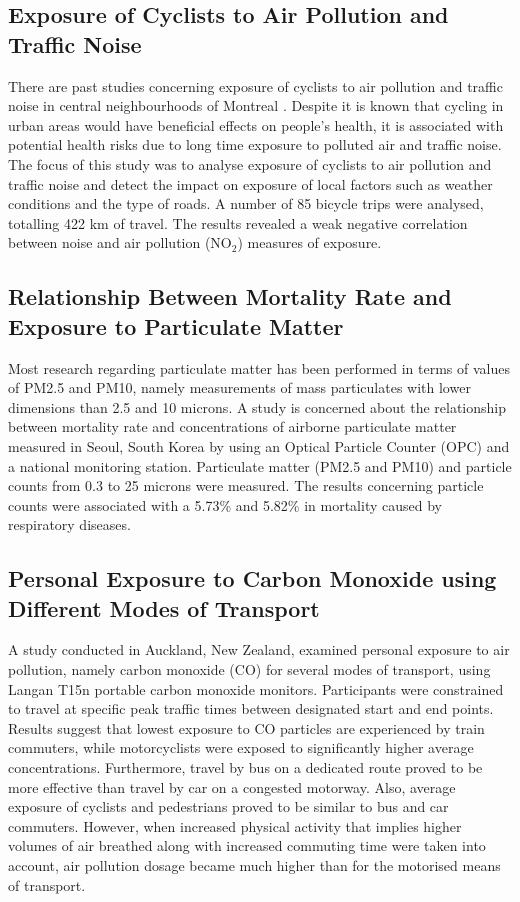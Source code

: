 \documentclass[bsc,frontabs,twoside,singlespacing, parskip,deptreport]{infthesis}     %
\begin{document}
\subsection{Exposure of Cyclists to Air Pollution and Traffic Noise}

There are past studies concerning exposure of cyclists to air pollution and traffic noise in central neighbourhoods of Montreal \cite{Apparicio201663}. Despite it is known that cycling in urban areas would have beneficial effects on people's health, it is associated with potential health risks due to long time exposure to polluted air and traffic noise. The focus of this study was to analyse exposure of cyclists to air pollution and traffic noise and detect the impact on exposure of local factors such as weather conditions and the type of roads. A number of 85 bicycle trips were analysed, totalling 422 km of travel. The results revealed a weak negative correlation between noise and air pollution (NO$_2$) measures of exposure.

\subsection{Relationship Between Mortality Rate and Exposure to Particulate Matter }

Most research regarding particulate matter has been performed in terms of values of PM2.5 and PM10, namely measurements of mass particulates with lower dimensions than 2.5 and 10 microns. A study \cite{Cho2008} is concerned about the relationship between mortality rate and concentrations of airborne particulate matter measured in Seoul, South Korea by using an Optical Particle Counter (OPC) and a national monitoring station. Particulate matter (PM2.5 and PM10) and particle counts from 0.3 to 25 microns were measured. The results concerning particle counts were associated with a 5.73\% and 5.82\% in mortality caused by respiratory diseases.


\subsection{Personal Exposure to Carbon Monoxide using Different Modes of Transport}

A study \cite{Dirks2012} conducted in Auckland, New Zealand, examined personal exposure to air pollution, namely carbon monoxide (CO) for several modes of transport, using Langan T15n \cite{Langan} portable carbon monoxide monitors. Participants were constrained to travel at specific peak traffic times between designated start and end points. Results suggest that lowest exposure to CO particles are experienced by train commuters, while motorcyclists were exposed to significantly higher average concentrations. Furthermore, travel by bus on a dedicated route proved to be more effective than travel by car on a congested motorway. Also, average exposure of cyclists and pedestrians proved to be similar to bus and car commuters. However, when increased physical activity that implies higher volumes of air breathed along with increased commuting time were taken into account, air pollution dosage became much higher than for the motorised means of transport. 
\end{document}
